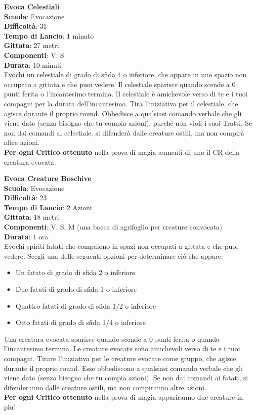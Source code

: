 \begin{multicols}{2}
\medskip\textbf{Evoca Celestiali}\\
\textbf{Scuola}: Evocazione\\
\textbf{Difficoltà}: 31\\
\textbf{Tempo di Lancio}: 1 minuto\\
\textbf{Gittata}: 27 metri\\
\textbf{Componenti}: V, S\\
\textbf{Durata}: 10 minuti\\
Evochi un celestiale di grado di sfida 4 o inferiore, che appare in uno spazio non occupato a gittata e che puoi vedere. Il celestiale sparisce quando scende a 0 punti ferita o l'incantesimo termina. Il celestiale è amichevole verso di te e i tuoi compagni per la durata dell'incantesimo. Tira l'iniziativa per il celestiale, che agisce durante il proprio round. Obbedisce a qualsiasi comando verbale che gli viene dato (senza bisogno che tu compia azioni), purché non violi i suoi Tratti. Se non dai comandi al celestiale, si difenderà dalle creature ostili, ma non compirà altre azioni.\\
\textbf{Per ogni Critico ottenuto} nella prova di magia aumenti di uno il CR della creatura evocata.

\medskip\textbf{Evoca Creature Boschive}\\
\textbf{Scuola}: Evocazione\\
\textbf{Difficoltà}: 23\\
\textbf{Tempo di Lancio}: 2 Azioni\\
\textbf{Gittata}: 18 metri\\
\textbf{Componenti}: V, S, M (una bacca di agrifoglio per creature convocata)\\
\textbf{Durata}: 1 ora \\
Evochi spiriti fatati che compaiono in spazi non occupati a gittata e che puoi vedere. Scegli una delle seguenti opzioni per determinare ciò che appare:
\begin{itemize}
\item Un fatato di grado di sfida 2 o inferiore
\item Due fatati di grado di sfida 1 o inferiore
\item Quattro fatati di grado di sfida 1/2 o inferiore
\item Otto fatati di grado di sfida 1/4 o inferiore
\end{itemize}
\medskip
Una creatura evocata sparisce quando scende a 0 punti ferita o quando l'incantesimo termina. Le creature evocate sono amichevoli verso di te e i tuoi compagni. Tirare l'iniziativa per le creature evocate come gruppo, che agisce durante il proprio round. Esse obbediscono a qualsiasi comando verbale che gli viene dato (senza bisogno che tu compia azioni). Se non dai comandi ai fatati, si difenderanno dalle creature ostili, ma non compiranno altre azioni.\\
\textbf{Per ogni Critico ottenuto} nella prova di magia appariranno due creature in piu'


\end{multicols}
